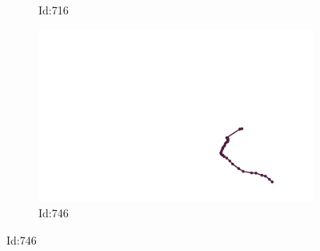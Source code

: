 \documentclass[12pt,twoside]{report}
\begin{document}
\begin{figure}
\begin{subfigure}[b]{0.20\textwidth}
\caption{Id:716}
\end{subfigure}
\begin{subfigure}[b]{0.20\textwidth}
\centering
\includegraphics[width=\textwidth]{../../trajectories/746.png}
\caption{Id:746}
\end{subfigure}
\end{figure}
\end{document}
